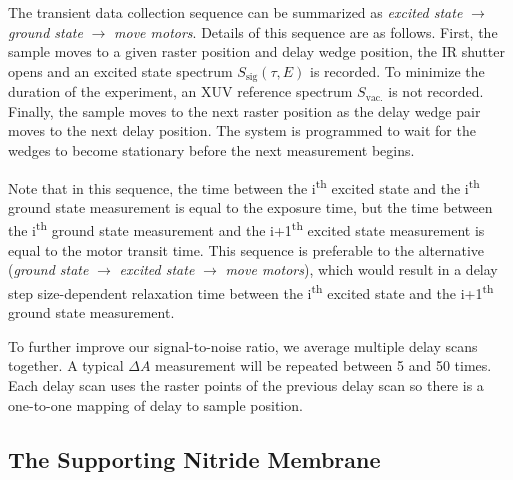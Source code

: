 The transient data collection sequence can be summarized as \textit{excited state} $\rightarrow$ \textit{ground state} $\rightarrow$ \textit{move motors}. Details of this sequence are as follows. First, the sample moves to a given raster position and delay wedge position, the IR shutter opens and an excited state spectrum $S_{\textrm{sig}}(\tau, E)$ is recorded. To minimize the duration of the experiment, an XUV reference spectrum $S_{\textrm{vac.}}$ is not recorded. Finally, the sample moves to the next raster position as the delay wedge pair moves to the next delay position. The system is programmed to wait for the wedges to become stationary before the next measurement begins.

Note that in this sequence, the time between the i\textsuperscript{th} excited state and the i\textsuperscript{th} ground state measurement is equal to the exposure time, but the time between the i\textsuperscript{th} ground state measurement and the i+1\textsuperscript{th} excited state measurement is equal to the motor transit time. This sequence is preferable to the alternative (\textit{ground state} $\rightarrow$ \textit{excited state} $\rightarrow$ \textit{move motors}), which would result in a delay step size-dependent relaxation time between the i\textsuperscript{th} excited state and the i+1\textsuperscript{th} ground state measurement.

To further improve our signal-to-noise ratio, we average multiple delay scans together. A typical $\Delta A$ measurement will be repeated between 5 and 50 times. Each delay scan uses the raster points of the previous delay scan so there is a one-to-one mapping of delay to sample position.


\subsection{The Supporting Nitride Membrane}

